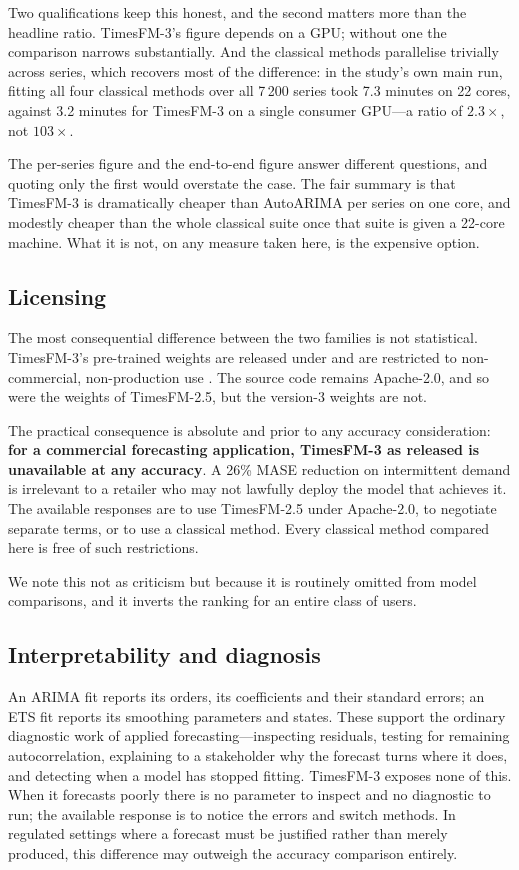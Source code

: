 \documentclass[article]{ajs}
\begin{document}
Two qualifications keep this honest, and the second matters more than the headline ratio.
TimesFM-3's figure depends on a GPU; without one the comparison narrows substantially. And the
classical methods parallelise trivially across series, which recovers most of the difference: in
the study's own main run, fitting all four classical methods over all 7\,200 series took 7.3
minutes on 22 cores, against 3.2 minutes for TimesFM-3 on a single consumer GPU---a ratio of
$2.3\times$, not $103\times$.

The per-series figure and the end-to-end figure answer different questions, and quoting only the
first would overstate the case. The fair summary is that TimesFM-3 is dramatically cheaper than
AutoARIMA per series on one core, and modestly cheaper than the whole classical suite once that
suite is given a 22-core machine. What it is not, on any measure taken here, is the expensive
option.

\subsection{Licensing}

The most consequential difference between the two families is not statistical. TimesFM-3's
pre-trained weights are released under  and are
restricted to non-commercial, non-production use \citep{timesfm3repo}. The source code remains
Apache-2.0, and so were the weights of TimesFM-2.5, but the version-3 weights are not.

The practical consequence is absolute and prior to any accuracy consideration: \textbf{for a
commercial forecasting application, TimesFM-3 as released is unavailable at any accuracy}. A
26\% MASE reduction on intermittent demand is irrelevant to a retailer who may not lawfully
deploy the model that achieves it. The available responses are to use TimesFM-2.5 under
Apache-2.0, to negotiate separate terms, or to use a classical method. Every classical method
compared here is free of such restrictions.

We note this not as criticism but because it is routinely omitted from model comparisons, and
it inverts the ranking for an entire class of users.

\subsection{Interpretability and diagnosis}

An ARIMA fit reports its orders, its coefficients and their standard errors; an ETS fit reports
its smoothing parameters and states. These support the ordinary diagnostic work of applied
forecasting---inspecting residuals, testing for remaining autocorrelation, explaining to a
stakeholder why the forecast turns where it does, and detecting when a model has stopped
fitting. TimesFM-3 exposes none of this. When it forecasts poorly there is no parameter to
inspect and no diagnostic to run; the available response is to notice the errors and switch
methods. In regulated settings where a forecast must be justified rather than merely produced,
this difference may outweigh the accuracy comparison entirely.
\end{document}
